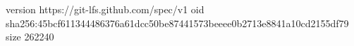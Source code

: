 version https://git-lfs.github.com/spec/v1
oid sha256:45bcf611344486376a61dcc50be87441573beeee0b2713e8841a10cd2155df79
size 262240
